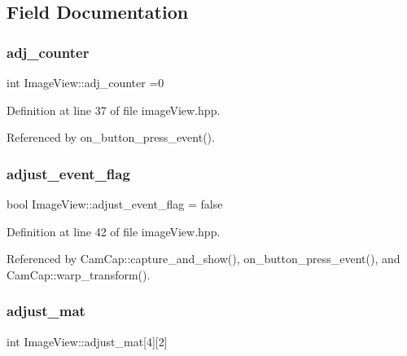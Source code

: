 \subsection{Field Documentation}
\mbox{\label{class_image_view_a69f2acef8641170135ff89dd6d4e9e6c}} 
\subsubsection{\texorpdfstring{adj\+\_\+counter}{adj\_counter}}
{\footnotesize\ttfamily int Image\+View\+::adj\+\_\+counter =0}



Definition at line 37 of file image\+View.\+hpp.



Referenced by on\+\_\+button\+\_\+press\+\_\+event().

\mbox{\label{class_image_view_abc6c43376871979a67c86b041025ab07}} 
\subsubsection{\texorpdfstring{adjust\+\_\+event\+\_\+flag}{adjust\_event\_flag}}
{\footnotesize\ttfamily bool Image\+View\+::adjust\+\_\+event\+\_\+flag = false}



Definition at line 42 of file image\+View.\+hpp.



Referenced by Cam\+Cap\+::capture\+\_\+and\+\_\+show(), on\+\_\+button\+\_\+press\+\_\+event(), and Cam\+Cap\+::warp\+\_\+transform().

\mbox{\label{class_image_view_a59c7771f6220f24b661c3ba8ea3b27f1}} 
\subsubsection{\texorpdfstring{adjust\+\_\+mat}{adjust\_mat}}
{\footnotesize\ttfamily int Image\+View\+::adjust\+\_\+mat\mbox{[}4\mbox{]}\mbox{[}2\mbox{]}}



